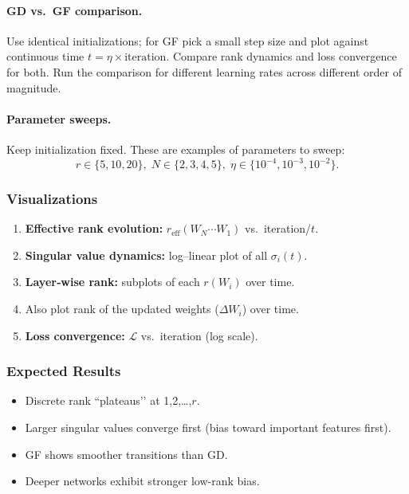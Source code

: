 \documentclass[11pt]{article}
\newcommand{\Wi}{\ensuremath{W_i}}
\newcommand{\Wprod}{\ensuremath{W_N\cdots W_1}}
\begin{document}
\paragraph*{GD vs.\ GF comparison.}
Use identical initializations; for GF pick a small step size and plot against continuous time \(t = \eta \times \text{iteration}\). Compare rank dynamics and loss convergence for both. Run the comparison for different learning rates across different order of magnitude.

\paragraph*{Parameter sweeps.}
Keep initialization fixed. These are examples of parameters to sweep:
\[
  r\!\in\!\{5,10,20\},\;
  N\!\in\!\{2,3,4,5\},\;
  \eta\!\in\!\{10^{-4},10^{-3},10^{-2}\}.
\]

\subsubsection*{Visualizations}

\begin{enumerate}[label=\textbf{\arabic*.},leftmargin=*,nosep]
  \item \textbf{Effective rank evolution:} \(r_{\mathrm{eff}}(\Wprod)\) vs.\ iteration/\(t\).
  \item \textbf{Singular value dynamics:} log–linear plot of all \(\sigma_i(t)\).
  \item \textbf{Layer‐wise rank:} subplots of each \(r(\Wi)\) over time.
  \item Also plot rank of the updated weights (\(\Delta{\Wi}\)) over time.
  \item \textbf{Loss convergence:} \(\mathcal{L}\) vs.\ iteration (log scale).
\end{enumerate}

\subsubsection*{Expected Results}

\begin{itemize}[nosep]
  \item Discrete rank “plateaus’’ at 1,2,\dots,\(r\).
  \item Larger singular values converge first (bias toward important features first).
  \item GF shows smoother transitions than GD.
  \item Deeper networks exhibit stronger low-rank bias.
\end{itemize}
\end{document}
